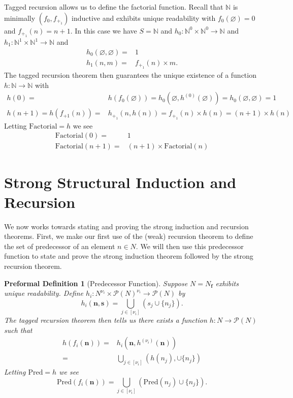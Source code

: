 \documentclass[oneside, 12pt]{book}
\theoremstyle{break}
\newtheorem{preformal definition}[definition]{Preformal Definition}
\newtheorem{preformal theorem}[theorem]{Preformal Theorem}
\newcommand{\bv}[1]{\boldsymbol{#1}}
\newcommand{\mc}[1]{\mathcal{#1}}
\newcommand{\N}[0]{\mathbb{N}}
\begin{document}
			Tagged recursion allows us to define the factorial function.
			Recall that $\N$ is minimally $(f_0, f_{+_1})$ inductive and exhibits unique readability with $f_0(\varnothing) = 0$ and $f_{+_1}(n) = n+1$.
			In this case we have $S = \N$ and $h_0: \N^0 \times \N^0 \to \N$ and $h_1: \N^1 \times \N^1 \to \N$ and
			\begin{align*}
				h_0(\varnothing, \varnothing) =& 1\\
				h_1(n, m) =& f_{+_1}(n) \times m.
			\end{align*}
			The tagged recursion theorem then guarantees the unique existence of a function $h: \N \to \N$ with
			\begin{align*}
				h(0) =& h(f_0(\varnothing)) = h_0(\varnothing, h^{(0)}(\varnothing)) = h_0(\varnothing, \varnothing)= 1\\
				h(n+1) = h(f_{+1}(n)) =& h_{+_1}(n, h(n)) = f_{+_1}(n) \times h(n) = (n+1) \times h(n)
			\end{align*}
			Letting $\text{Factorial} = h$ we see
			\begin{align*}
				\text{Factorial}(0) =& 1\\
				\text{Factorial}(n+1) =& (n+1) \times \text{Factorial}(n)
			\end{align*}
	
		\section{Strong Structural Induction and Recursion}
			
			We now works towards stating and proving the strong induction and recursion theorems.
			First, we make our first use of the (weak) recursion theorem to define the set of predecessor of an element $n\in N$.
			We will then use this predecessor function to state and prove the strong induction theorem followed by the strong recursion theorem.
		
			\begin{preformal definition}[Predecessor Function]
				Suppose $N = N_{\bv{f}}$ exhibits unique readability.
				Define $h_i:N^{\nu_i} \times \mc{P}(N)^{\nu_i} \to \mc{P}(N)$ by
				\begin{equation*}
					h_i(\bv{n}, \bv{s}) = \bigcup_{j\in [\nu_i]} \left(s_j\cup \{n_j\}\right).
				\end{equation*}
				The tagged recursion theorem then tells us there exists a function $h: N \to \mc{P}(N)$ such that
				\begin{align*}
					h(f_i(\bv{n})) =& h_i(\bv{n}, h^{(\nu_i)}(\bv{n}))\\
					=& \bigcup_{j\in [\nu_i]} \left(h(n_j),\cup \{n_j\}\right)
				\end{align*}
				Letting $\text{Pred} = h$ we see
				\begin{equation*}
					\text{Pred}(f_i(\bv{n})) = \bigcup_{j\in [\nu_i]} \left(\text{Pred}(n_j) \cup \{n_j\}\right).
				\end{equation*}
			\end{preformal definition}
			
\end{document}

